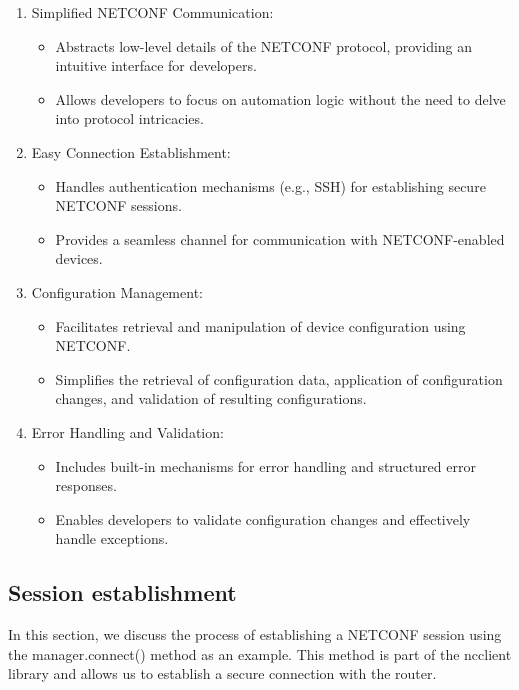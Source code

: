 \begin{enumerate}
    \item Simplified NETCONF Communication:
    \begin{itemize}
      \item Abstracts low-level details of the NETCONF protocol, providing an intuitive interface for developers.
      \item Allows developers to focus on automation logic without the need to delve into protocol intricacies.
    \end{itemize}
    
    \item Easy Connection Establishment:
    \begin{itemize}
      \item Handles authentication mechanisms (e.g., SSH) for establishing secure NETCONF sessions.
      \item Provides a seamless channel for communication with NETCONF-enabled devices.
    \end{itemize}
    
    \item Configuration Management:
    \begin{itemize}
      \item Facilitates retrieval and manipulation of device configuration using NETCONF.
      \item Simplifies the retrieval of configuration data, application of configuration changes, and validation of resulting configurations.
    \end{itemize}
    
    \item Error Handling and Validation:
    \begin{itemize}
      \item Includes built-in mechanisms for error handling and structured error responses.
      \item Enables developers to validate configuration changes and effectively handle exceptions.
    \end{itemize}

\end{enumerate}
\subsection{Session establishment}

In this section, we discuss the process of establishing a NETCONF session using the manager.connect() method as an example. This method is part of the ncclient library and allows us to establish a secure connection with the router.

